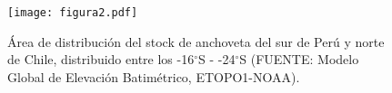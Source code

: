 \begin{figure}[H]
    \centering
    \texttt{[image: figura2.pdf]}  
    \caption{Área de distribución del stock de anchoveta del sur de Perú y norte de Chile, distribuido entre los -16$^\circ$S - -24$^\circ$S (FUENTE: Modelo Global de Elevación Batimétrico, ETOPO1-NOAA).}
    \label{fig:figure2}
\end{figure}  